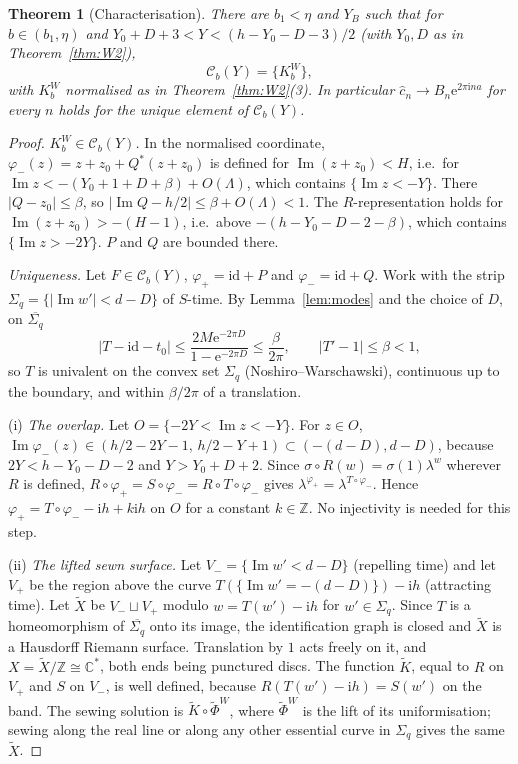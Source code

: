 \documentclass[11pt]{amsart}
\newtheorem{theorem}{Theorem}[section]
\theoremstyle{definition}
\newcommand{\Rr}{R}
\newcommand{\Kk}{K}
\newcommand{\eee}{\mathrm{e}}
\newcommand{\ii}{\mathrm{i}}
\begin{document}
\begin{theorem}[Characterisation]\label{thm:char}
There are $b_1<\eta$ and $Y_B$ such that for $b\in(b_1,\eta)$ and
$Y_0+D+3<Y<(h-Y_0-D-3)/2$ (with $Y_0,D$ as in Theorem~\ref{thm:W2}),
\[
 \mathcal C_b(Y)=\{\Kk^W_b\},
\]
with $\Kk^W_b$ normalised as in Theorem~\ref{thm:W2}(3).  In particular
$\hat c_n\to B_n\eee^{2\pi\ii na}$ for every $n$ holds for the unique element
of $\mathcal C_b(Y)$.
\end{theorem}

\begin{proof}
\emph{$\Kk^W_b\in\mathcal C_b(Y)$.}  In the normalised coordinate,
$\varphi_-(z)=z+z_0+Q^*(z+z_0)$ is defined for
$\operatorname{Im}(z+z_0)<H$, i.e.\ for $\operatorname{Im}z<-(Y_0+1+D+\beta)+O(\Lambda)$,
which contains $\{\operatorname{Im}z<-Y\}$.  There $|Q-z_0|\le\beta$, so
$|\operatorname{Im}Q-h/2|\le\beta+O(\Lambda)<1$.  The $\Rr$-representation holds
for $\operatorname{Im}(z+z_0)>-(H-1)$, i.e.\ above
$-(h-Y_0-D-2-\beta)$, which contains $\{\operatorname{Im}z>-2Y\}$.  $P$ and $Q$
are bounded there.

\emph{Uniqueness.}  Let $F\in\mathcal C_b(Y)$, $\varphi_+=\mathrm{id}+P$ and
$\varphi_-=\mathrm{id}+Q$.  Work with the strip
$\Sigma_q=\{|\operatorname{Im}w'|<d-D\}$ of $S$-time.  By Lemma~\ref{lem:modes} and
the choice of $D$, on $\overline{\Sigma_q}$
\[
 |T-\mathrm{id}-t_0|\le\frac{2M\eee^{-2\pi D}}{1-\eee^{-2\pi D}}\le\frac{\beta}{2\pi},\qquad
 |T'-1|\le\beta<1 ,
\]
so $T$ is univalent on the convex set $\Sigma_q$ (Noshiro--Warschawski),
continuous up to the boundary, and within $\beta/2\pi$ of a translation.

(i) \emph{The overlap.}  Let $O=\{-2Y<\operatorname{Im}z<-Y\}$.  For $z\in O$,
$\operatorname{Im}\varphi_-(z)\in(h/2-2Y-1,\,h/2-Y+1)\subset(-(d-D),d-D)$,
because $2Y<h-Y_0-D-2$ and $Y>Y_0+D+2$.  Since
$\sigma\circ\Rr(w)=\sigma(1)\lambda^w$ wherever $\Rr$ is defined,
$\Rr\circ\varphi_+=S\circ\varphi_-=\Rr\circ T\circ\varphi_-$ gives
$\lambda^{\varphi_+}=\lambda^{T\circ\varphi_-}$.  Hence
$\varphi_+=T\circ\varphi_--\ii h+k\ii h$ on $O$ for a constant $k\in\mathbb Z$.
No injectivity is needed for this step.

(ii) \emph{The lifted sewn surface.}  Let $V_-=\{\operatorname{Im}w'<d-D\}$
(repelling time) and let $V_+$ be the region above the curve
$T(\{\operatorname{Im}w'=-(d-D)\})-\ii h$ (attracting time).  Let $\tilde X$ be
$V_-\sqcup V_+$ modulo $w=T(w')-\ii h$ for $w'\in\Sigma_q$.  Since $T$ is a
homeomorphism of $\overline{\Sigma_q}$ onto its image, the identification
graph is closed and $\tilde X$ is a Hausdorff Riemann surface.  Translation by
$1$ acts freely on it, and $X=\tilde X/\mathbb Z\cong\mathbb C^*$, both ends
being punctured discs.  The function $\tilde K$, equal to $\Rr$ on $V_+$ and
$S$ on $V_-$, is well defined, because $\Rr(T(w')-\ii h)=S(w')$ on the band.
The sewing solution is $\tilde K\circ\tilde\Phi^W$, where $\tilde\Phi^W$ is the
lift of its uniformisation; sewing along the real line or along any other
essential curve in $\Sigma_q$ gives the same $\tilde X$.


\end{proof}
\end{document}
